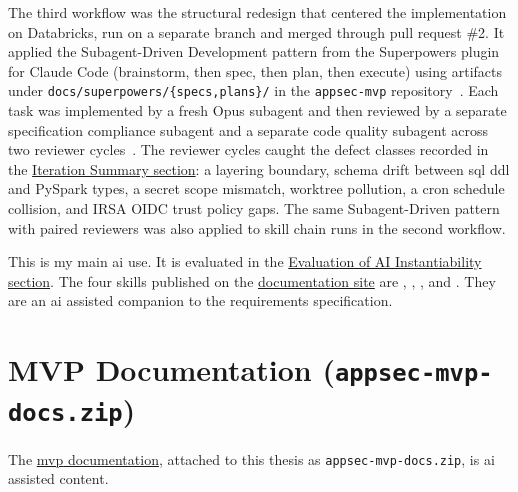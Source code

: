 The third workflow was the structural redesign that centered the implementation on Databricks, run on a separate branch and merged through pull request \#2. It applied the Subagent-Driven Development pattern from the Superpowers plugin for Claude Code (brainstorm, then spec, then plan, then execute) using artifacts under \texttt{docs/superpowers/\{specs,plans\}/} in the \texttt{appsec-mvp} repository~\parencite{Vincent2026Superpowers}. Each task was implemented by a fresh Opus subagent and then reviewed by a separate specification compliance subagent and a separate code quality subagent across two reviewer cycles~\parencite{Anthropic2026ClaudeCode, Anthropic2025ClaudeOpus45, Anthropic2026ClaudeOpus46, Anthropic2026ClaudeOpus47}. The reviewer cycles caught the defect classes recorded in the \hyperref[sec:iteration-summary]{Iteration Summary section}: a layering boundary, schema drift between \gls{sql} \gls{ddl} and PySpark types, a secret scope mismatch, worktree pollution, a cron schedule collision, and IRSA OIDC trust policy gaps. The same Subagent-Driven pattern with paired reviewers was also applied to skill chain runs in the second workflow.

This is my main \gls{ai} use. It is evaluated in the \hyperref[sec:ai-eval]{Evaluation of AI Instantiability section}. The four skills published on the \href{https://vkraus.github.io/appsec-mvp/platform/reference/connector-skills/}{documentation site} are , , , and . They are an \gls{ai} assisted companion to the requirements specification.

\section{MVP Documentation (\texttt{appsec-mvp-docs.zip})}
\label{sec:genai-mvp-docs}

The \href{https://vkraus.github.io/appsec-mvp/}{\gls{mvp} documentation}, attached to this thesis as \texttt{appsec-mvp-docs.zip}, is \gls{ai} assisted content.

